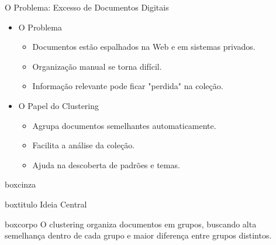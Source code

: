 \documentclass[aspectratio=43]{beamer}
\begin{document}
\begin{frame}[t]{O Problema: Excesso de Documentos Digitais}

\vspace{0.05cm}

\begin{itemize}

\item O Problema
\begin{itemize}
    \item Documentos estão espalhados na Web e em sistemas privados.
    \item Organização manual se torna difícil.
    \item Informação relevante pode ficar "perdida" na coleção.
\end{itemize}

    \vspace{0.3cm}
    
\item O Papel do Clustering
\begin{itemize}
    \item Agrupa documentos semelhantes automaticamente.
    \item Facilita a análise da coleção.
    \item Ajuda na descoberta de padrões e temas.
\end{itemize}

\end{itemize}

\begin{center}
\begin{beamercolorbox}[
    wd=0.80\paperwidth,
    sep=0pt
]{boxcinza}

    \begin{beamercolorbox}[
        wd=0.80\paperwidth,
        ht=0.65cm,
        dp=0.15cm,
        leftskip=0.25cm
    ]{boxtitulo}
        {\Large\color{uelgreen} Ideia Central}
    \end{beamercolorbox}

    \begin{beamercolorbox}[
        wd=0.80\paperwidth,
        sep=0.45cm
    ]{boxcorpo}
        \small
        O clustering organiza documentos em grupos, buscando alta semelhança dentro de cada grupo e maior diferença entre grupos distintos.
    \end{beamercolorbox}

\end{beamercolorbox}
\end{center}
\end{frame}
\end{document}
